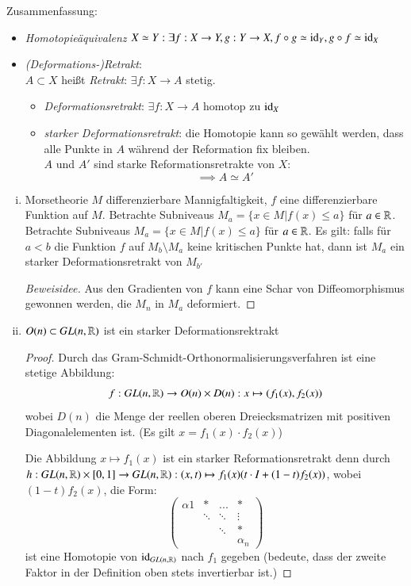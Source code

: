 \documentclass[a4paper,10pt]{scrartcl}
\begin{document}
\begin{seg}{Zusammenfassung:}
\begin{itemize}
 \item \emph{Homotopieäquivalenz} $X\simeq Y: \exists f: X\to Y, g: Y\to X, f\circ g \simeq \operatorname{id}_Y, g\circ f \simeq \operatorname{id}_X$
 \item \emph{(Deformations-)Retrakt}:\\
$A\subset X$ heißt \emph{Retrakt}: $\exists f: X\to A$ stetig.
\begin{itemize}
\item \emph{Deformationsretrakt}: $\exists f: X\to A$ homotop zu $\operatorname{id}_X$
\item \emph{starker Deformationsretrakt}: die Homotopie kann so gewählt werden, dass alle Punkte in $A$ während der Reformation fix bleiben.\\
\fixme[fig46]
$A$ und $A'$ sind starke Reformationsretrakte von $X$:
\[
 \implies A \simeq A'
\]
\end{itemize}
\end{itemize}
\end{seg}
\begin{exs*}
\begin{enumerate}[(i)]
 \item 
\begin{seg}{Morsetheorie} 
$M$ differenzierbare Mannigfaltigkeit, $f$ eine differenzierbare Funktion auf $M$. Betrachte Subniveaus $M_a=\{x\in M|f(x)\le a\}$ für $a\in \mathbb{R}$.
Betrachte Subniveaus $M_a=\{x\in M|f(x)\le a\}$ für $a\in \mathbb{R}$.
 \fixme[fig47]
Es gilt: falls für $a<b$ die Funktion $f$ auf $M_b\setminus M_a$ keine kritischen Punkte hat, dann ist $M_a$ ein starker Deformationsretrakt von $M_{b'}$
\end{seg}
\begin{proof}[Beweisidee]
 Aus den Gradienten von $f$ kann eine Schar von Diffeomorphismus gewonnen werden, die $M_n$ in $M_a$ deformiert.
\end{proof}
\item $O(n)\subset GL(n, \mathbb{R})$ ist ein starker Deformationsrektrakt
\begin{proof}
 Durch das Gram-Schmidt-Orthonormalisierungsverfahren ist eine stetige Abbildung:
\[
 f: GL(n,\mathbb{R})\to O(n)\times D(n): x\mapsto (f_1(x), f_2(x))
\]
wobei $D(n)$ die Menge der reellen oberen Dreiecksmatrizen mit positiven Diagonalelementen ist. (Es gilt $x=f_1(x)\cdot f_2(x)$)

Die Abbildung $x\mapsto f_1(x)$ ist ein starker Reformationsretrakt denn durch $h: GL(n,\mathbb{R})\times [0,1]\to GL(n,\mathbb{R}): (x,t)\mapsto f_1(x)(t\cdot I+(1-t)f_2(x))$, wobei $(1-t)f_2(x)$, die Form:
 \[
  \begin{pmatrix}
   \alpha 1 & * & ...& *\\
 & \ddots & \ddots & \vdots\\
 & & \ddots & *\\
 & & & \alpha_n
  \end{pmatrix}
 \]
ist eine Homotopie von $\operatorname{id}_{GL(n, \mathbb{R})}$ nach $f_1$ gegeben (bedeute, dass der zweite Faktor in der Definition oben stets invertierbar ist.)
\end{proof}
\end{enumerate}
\end{exs*}
\end{document}
